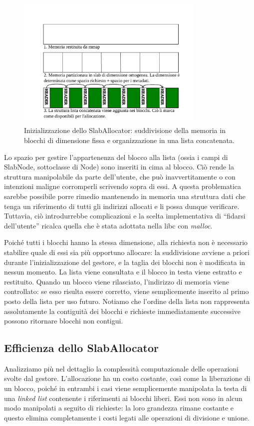 \begin{figure}[H]
    \centering
    \includegraphics[width=0.8\textwidth]{images/slab/slab_allocator_init.pdf}
    \caption{Inizializzazione dello SlabAllocator: suddivisione della memoria in blocchi di dimensione fissa e organizzazione in una lista concatenata.}
    \label{fig:slab_allocator_init}
\end{figure}

Lo spazio per gestire l’appartenenza del blocco alla lista (ossia i campi di SlabNode, sottoclasse di Node) sono inseriti in cima al blocco. Ciò rende la struttura manipolabile da parte dell’utente, che può inavvertitamente o con intenzioni maligne corromperli scrivendo sopra di essi. A questa problematica sarebbe possibile porre rimedio mantenendo in memoria una struttura dati che tenga un riferimento di tutti gli indirizzi allocati e li possa dunque verificare. Tuttavia, ciò introdurrebbe complicazioni e la scelta implementativa di “fidarsi dell’utente” ricalca quella che è stata adottata nella libc con \textit{malloc}.

Poiché tutti i blocchi hanno la stessa dimensione, alla richiesta non è necessario stabilire quale di essi sia più opportuno allocare: la suddivisione avviene a priori durante l’inizializzazione del gestore, e la taglia dei blocchi non è modificata in nessun momento. La lista viene consultata e il blocco in testa viene estratto e restituito. Quando un blocco viene rilasciato, l’indirizzo di memoria viene controllato: se esso risulta essere corretto, viene semplicemente inserito al primo posto della lista per uso futuro. Notiamo che l’ordine della lista non rappresenta assolutamente la contiguità dei blocchi e richieste immediatamente successive possono ritornare blocchi non contigui.

\subsection*{Efficienza dello SlabAllocator}
Analizziamo più nel dettaglio la complessità computazionale delle operazioni svolte dal gestore. L’allocazione ha un costo costante, così come la liberazione di un blocco, poiché in entrambi i casi viene semplicemente manipolata la testa di una \textit{linked list} contenente i riferimenti ai blocchi liberi. Essi non sono in alcun modo manipolati a seguito di richieste: la loro grandezza rimane costante e questo elimina completamente i costi legati alle operazioni di divisione e unione.

